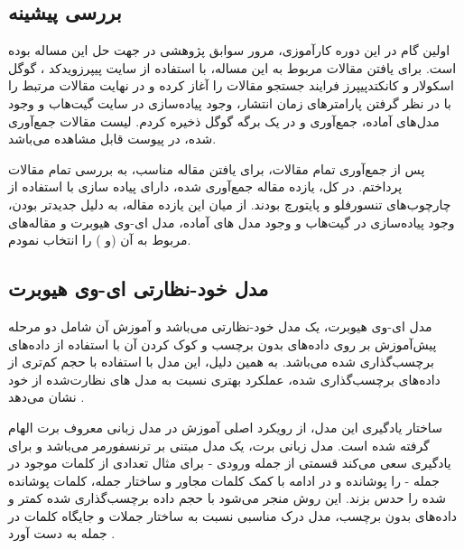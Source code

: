 \subsection{بررسی پیشینه}

اولین گام در این دوره کارآموزی، مرور سوابق پژوهشی در جهت حل این مساله بوده است. برای یافتن مقالات مربوط به این مساله، با استفاده از سایت پیپرزویدکد
، گوگل اسکولار
و کانکتدپیپرز
فرایند جستجو مقالات را آغاز کرده و در نهایت مقالات مرتبط را با در نظر گرفتن پارامتر‌های زمان انتشار، وجود پیاده‌سازی در سایت گیت‌هاب
 و وجود مدل‌های آماده، جمع‌آوری و در یک برگه گوگل ذخیره کردم. لیست مقالات جمع‌آوری شده، در پیوست قابل مشاهده می‌باشد. %
 
پس از جمع‌آوری تمام مقالات، برای یافتن مقاله مناسب، به بررسی تمام مقالات پرداختم. در کل، یازده مقاله جمع‌آوری شده، دارای پیاده سازی با استفاده از چارچوب‌های
 تنسورفلو
و پایتورچ
بودند. از میان این یازده مقاله، به دلیل جدیدتر بودن، وجود پیاده‌سازی در گیت‌هاب و وجود مدل های آماده، مدل ای-وی هیوبرت
 و مقاله‌های مربوط به آن
(\cite{shi2022learning}و \cite{shi2022robust}) را انتخاب نمودم.

\subsection{مدل خود-نظارتی ای-وی هیوبرت}

مدل ای-وی هیوبرت، یک مدل خود-نظارتی
می‌باشد و آموزش آن شامل دو مرحله پیش‌آموزش بر روی داده‌های بدون برچسب و کوک کردن آن با استفاده از داده‌های برچسب‌گذاری شده می‌باشد. به همین دلیل، این مدل با استفاده با حجم کم‌تری از داده‌های برچسب‌گذاری شده، عملکرد بهتری نسبت به مدل های نظارت‌شده
 از خود نشان می‌دهد
 \cite{shi2022learning}
 .

ساختار یادگیری این مدل، از رویکرد اصلی آموزش در مدل زبانی معروف برت
 الهام گرفته شده است. مدل زبانی برت، یک مدل مبتنی بر ترنسفورمر
  می‌باشد و برای یادگیری سعی می‌کند قسمتی از جمله ورودی - برای مثال تعدادی از کلمات موجود در جمله - را پوشانده و در ادامه با کمک کلمات مجاور و ساختار جمله، کلمات پوشانده شده را حدس بزند. این روش منجر می‌شود با حجم داده برچسب‌گذاری شده کمتر و داده‌های بدون برچسب، مدل درک مناسبی نسبت به ساختار جملات و جایگاه کلمات در جمله به دست آورد
  \cite{DBLP:journals/corr/abs-2106-07447}
  . 

